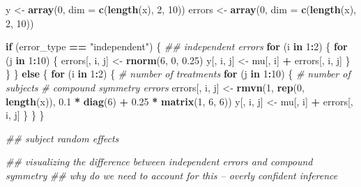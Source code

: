 \documentclass[
]{article}
\newenvironment{Shaded}{\begin{snugshade}}{\end{snugshade}}
\newcommand{\CommentTok}[1]{\textcolor[rgb]{0.56,0.35,0.01}{\textit{#1}}}
\newcommand{\ControlFlowTok}[1]{\textcolor[rgb]{0.13,0.29,0.53}{\textbf{#1}}}
\newcommand{\DataTypeTok}[1]{\textcolor[rgb]{0.13,0.29,0.53}{#1}}
\newcommand{\DecValTok}[1]{\textcolor[rgb]{0.00,0.00,0.81}{#1}}
\newcommand{\FloatTok}[1]{\textcolor[rgb]{0.00,0.00,0.81}{#1}}
\newcommand{\KeywordTok}[1]{\textcolor[rgb]{0.13,0.29,0.53}{\textbf{#1}}}
\newcommand{\NormalTok}[1]{#1}
\newcommand{\OperatorTok}[1]{\textcolor[rgb]{0.81,0.36,0.00}{\textbf{#1}}}
\newcommand{\StringTok}[1]{\textcolor[rgb]{0.31,0.60,0.02}{#1}}
\begin{document}
\begin{Shaded}
\begin{Highlighting}[]
{{\NormalTok{  y <-}\StringTok{ }\KeywordTok{array}\NormalTok{(}\DecValTok{0}\NormalTok{, }\DataTypeTok{dim =} \KeywordTok{c}\NormalTok{(}\KeywordTok{length}\NormalTok{(x), }\DecValTok{2}\NormalTok{, }\DecValTok{10}\NormalTok{))}
\NormalTok{  errors <-}\StringTok{ }\KeywordTok{array}\NormalTok{(}\DecValTok{0}\NormalTok{, }\DataTypeTok{dim =} \KeywordTok{c}\NormalTok{(}\KeywordTok{length}\NormalTok{(x), }\DecValTok{2}\NormalTok{, }\DecValTok{10}\NormalTok{))}
  
  \ControlFlowTok{if}\NormalTok{ (error_type }\OperatorTok{==}\StringTok{ "independent"}\NormalTok{) \{}
    \CommentTok{## independent errors}
    \ControlFlowTok{for}\NormalTok{ (i }\ControlFlowTok{in} \DecValTok{1}\OperatorTok{:}\DecValTok{2}\NormalTok{) \{}
      \ControlFlowTok{for}\NormalTok{ (j }\ControlFlowTok{in} \DecValTok{1}\OperatorTok{:}\DecValTok{10}\NormalTok{) \{}
\NormalTok{        errors[, i, j] <-}\StringTok{ }\KeywordTok{rnorm}\NormalTok{(}\DecValTok{6}\NormalTok{, }\DecValTok{0}\NormalTok{, }\FloatTok{0.25}\NormalTok{)}
\NormalTok{        y[, i, j] <-}\StringTok{ }\NormalTok{mu[, i] }\OperatorTok{+}\StringTok{ }\NormalTok{errors[, i, j]}
\NormalTok{      \}}
\NormalTok{    \}}
\NormalTok{  \} }\ControlFlowTok{else}\NormalTok{ \{}
    \ControlFlowTok{for}\NormalTok{ (i }\ControlFlowTok{in} \DecValTok{1}\OperatorTok{:}\DecValTok{2}\NormalTok{) \{     }\CommentTok{# number of treatments}
      \ControlFlowTok{for}\NormalTok{ (j }\ControlFlowTok{in} \DecValTok{1}\OperatorTok{:}\DecValTok{10}\NormalTok{) \{  }\CommentTok{# number of subjects}
        \CommentTok{# compound symmetry errors}
\NormalTok{        errors[, i, j] <-}\StringTok{ }\KeywordTok{rmvn}\NormalTok{(}\DecValTok{1}\NormalTok{, }\KeywordTok{rep}\NormalTok{(}\DecValTok{0}\NormalTok{, }\KeywordTok{length}\NormalTok{(x)), }\FloatTok{0.1} \OperatorTok{*}\StringTok{ }\KeywordTok{diag}\NormalTok{(}\DecValTok{6}\NormalTok{) }\OperatorTok{+}\StringTok{ }\FloatTok{0.25} \OperatorTok{*}\StringTok{ }\KeywordTok{matrix}\NormalTok{(}\DecValTok{1}\NormalTok{, }\DecValTok{6}\NormalTok{, }\DecValTok{6}\NormalTok{))}
\NormalTok{        y[, i, j] <-}\StringTok{ }\NormalTok{mu[, i] }\OperatorTok{+}\StringTok{ }\NormalTok{errors[, i, j]}
\NormalTok{      \}}
\NormalTok{    \}}
\NormalTok{  \}    }
  
  
  \CommentTok{## subject random effects}
  
  \CommentTok{## visualizing the difference between independent errors and compound symmetry}
  \CommentTok{## why do we need to account for this -- overly confident inference}
  
}}
\end{Highlighting}
\end{Shaded}
\end{document}
